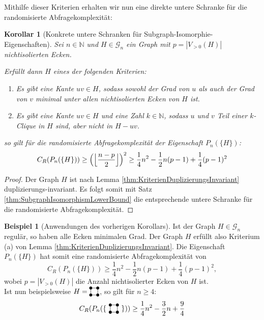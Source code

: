 \documentclass[10pt,a4paper, footheight=1mm, bibliography=totoc]{scrreprt}
\newtheorem{corollary}[definition]{Korollar}
\theoremstyle{definition}
\newtheorem{examplex}{Beispiel}
\newenvironment{example}[1]
{ \begin{leftbar} \begin{examplex}#1}
{ \end{examplex} \ignorespacesafterend \end{leftbar} }
\newcommand{\Square}{
\begin{tikzpicture}[main_node/.style={circle,fill=black},
inner sep=1.5pt, baseline=2pt]

    \node[main_node] (1) at (0,0) {};
    \node[main_node] (2) at (0.35, 0)  {};
    \node[main_node] (3) at (0.35, 0.35) {};
    \node[main_node] (4) at (0, 0.35) {};

    \draw (1) -- (2) -- (3) -- (4) -- (1);
\end{tikzpicture}
}
\begin{document}
Mithilfe dieser Kriterien erhalten wir nun
eine direkte untere Schranke für die randomisierte Abfragekomplexität:
\begin{corollary}[Konkrete untere Schranken für Subgraph-Isomorphie-Eigenschaften]
Sei $n\in \mathbb{N}$ und $H\in \mathcal{G}_n$ ein Graph
mit $p=|V_{>0}(H)|$ nichtisolierten Ecken.

Erfüllt dann $H$ eines der folgenden Kriterien:
\begin{enumerate}[label=\textbf{\emph{(\alph*)}}, leftmargin=*]
\item Es gibt eine Kante $uv\in H$, sodass sowohl
           der Grad von $u$ als auch der Grad von $v$
           minimal unter allen nichtisolierten Ecken von $H$ ist.
\item Es gibt eine Kante $uv \in H$ und eine Zahl
           $k\in \mathbb{N}$, sodass $u$ und $v$
           Teil einer $k$-Clique in $H$ sind, aber nicht
           in $H-uv$.
\end{enumerate}
so gilt für die randomisierte Abfragekomplexität der Eigenschaft 
$P_n(\{H\})$:
$$ C_R(P_n(\{H\})) \geq
\Big{ ( } \Big \lfloor  \frac{n-p}{2} \Big \rfloor \Big{)}^{2} \geq
\frac{1}{4}n^2 - \frac{1}{2}n(p-1) + \frac{1}{4}(p-1)^2
$$
\end{corollary}
\begin{proof}
Der Graph $H$ ist nach Lemma \ref{thm:KriterienDuplizierungsInvariant}
duplizierungs-invariant. Es folgt somit mit 
Satz \ref{thm:SubgraphIsomorphismLowerBound} die entsprechende
untere Schranke für die randomisierte Abfragekomplexität.
\end{proof}

\begin{example}[Anwendungen des vorherigen Korollars]
Ist der Graph $H\in\mathcal{G}_n$ regulär, so haben
alle Ecken minimalen Grad. Der Graph $H$ erfüllt also Kriterium (a)
von Lemma \ref{thm:KriterienDuplizierungsInvariant}.
Die Eigenschaft $P_n(\{H\})$ hat somit eine randomisierte
Abfragekomplexität von 
$$ C_R(P_n(\{H\})) \geq
\frac{1}{4}n^2 - \frac{1}{2}n(p-1) + \frac{1}{4}(p-1)^2,$$
wobei $p=|V_{>0}(H)|$ die Anzahl nichtisolierter Ecken von $H$ ist. \\
Ist nun beispielsweise $H=\Square$, so gilt für $n\geq 4$:
$$ C_R(P_n(\{\ \Square \ \})) \geq
\frac{1}{4}n^2 - \frac{3}{2}n + \frac{9}{4}$$
\end{example}
\end{document}
